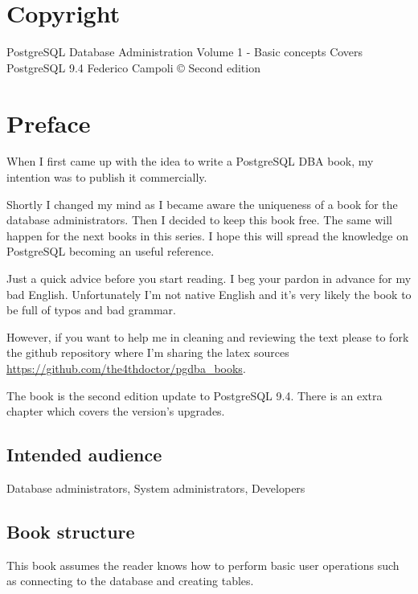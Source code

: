 \documentclass[oneside]{book}
\begin{document}
\chapter*{Copyright}
PostgreSQL Database Administration Volume 1 - Basic concepts\newline
Covers PostgreSQL 9.4
Federico Campoli \copyright {} \newline
Second edition\newline


 



\chapter*{Preface}
When I first came up with the idea to write a PostgreSQL DBA book, my intention was to 
publish it commercially.\newline

Shortly I changed my mind as I became aware the uniqueness of a book for the database 
administrators. Then I decided to keep this book free. The same will happen for the 
next books in this series. I hope this will spread the knowledge on PostgreSQL becoming an 
useful reference.\newline

Just a quick advice before you start reading. I beg your pardon in advance for my 
bad English. Unfortunately I'm not native English and it's very likely the book to be full of 
typos and bad grammar.\newline

However, if you want to help me in cleaning and reviewing the text please to fork 
the github repository where I'm sharing the latex sources 
\href{https://github.com/the4thdoctor/pgdba\_books}{
https://github.com/the4thdoctor/pgdba\_books}.\newline

The book is the second edition update to PostgreSQL 9.4. There is an extra chapter which covers the 
version's upgrades.

\section*{Intended audience}
Database administrators, System administrators, Developers

\section*{Book structure}
This book assumes the reader knows how to perform basic user operations such as
connecting to the database and creating tables.\newline
\end{document}
